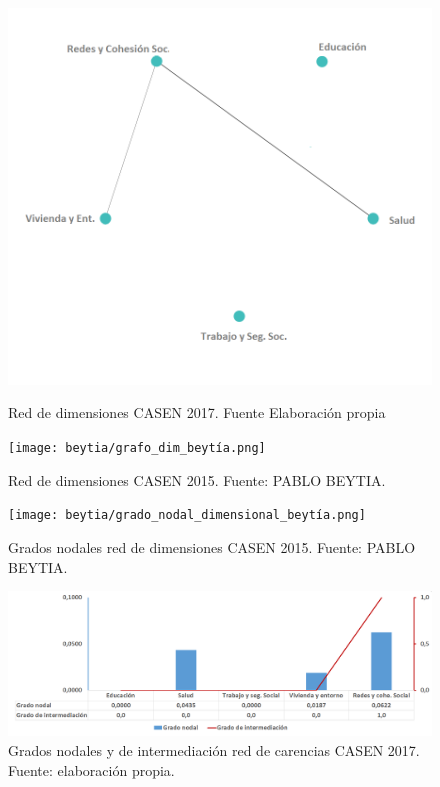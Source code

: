 \documentclass[12pt,letterpaper,spanish]{article}
\begin{document}
\begin{figure}[H]
  \centering
  \begin{minipage}[b]{0.49\textwidth}
    \includegraphics[width=\textwidth]{Grafos/GrafoDimensiones.png}
    \caption{Red de dimensiones CASEN 2017. Fuente Elaboración propia}
    \label{reddimensional2017}
  \end{minipage}
  \hfill
  \begin{minipage}[b]{0.49\textwidth}
    \texttt{[image: beytia/grafo\_dim\_beytía.png]}
    \caption{Red de dimensiones CASEN 2015. Fuente: PABLO BEYTIA.}
    \label{reddimensional2015}
  \end{minipage}
\end{figure}




\begin{figure}[H]
    \centering
    \texttt{[image: beytia/grado\_nodal\_dimensional\_beytía.png]}
    \caption{Grados nodales red de dimensiones CASEN 2015. Fuente: PABLO BEYTIA.}
    \label{nodosdim2015}
\end{figure}


\begin{figure}[H]
    \centering
    \includegraphics[width=\textwidth]{Grafos/nc_dimensional.png}
    \caption{Grados nodales y de intermediación red de carencias CASEN 2017. Fuente: elaboración propia.}
    \label{nodosdim2017}
\end{figure}
\end{document}

